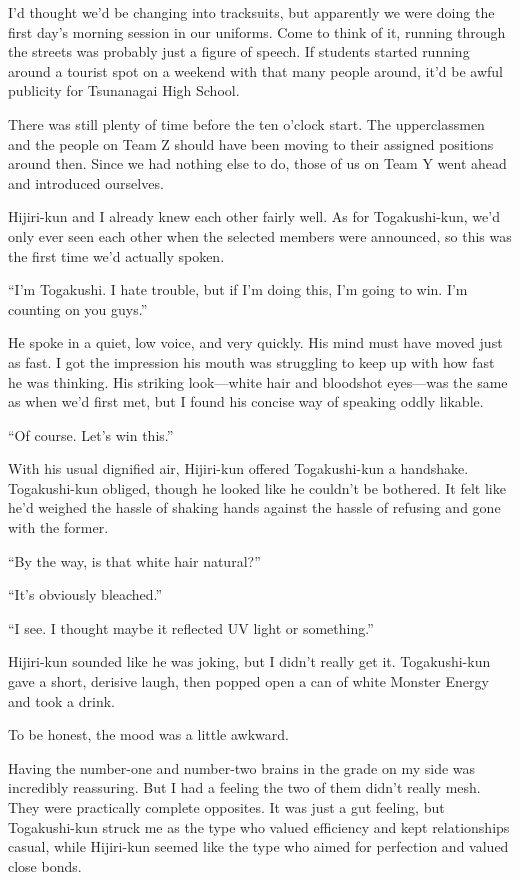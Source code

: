 \documentclass[
    a4paper,
    12pt,
    twoside,
    openany,
    UTF8,
    fontset=windows
]{ctexbook}
\begin{document}
I'd thought we'd be changing into tracksuits, but apparently we were doing the first day's morning session in our uniforms. Come to think of it, running through the streets was probably just a figure of speech. If students started running around a tourist spot on a weekend with that many people around, it'd be awful publicity for Tsunanagai High School.

There was still plenty of time before the ten o'clock start. The upperclassmen and the people on Team Z should have been moving to their assigned positions around then. Since we had nothing else to do, those of us on Team Y went ahead and introduced ourselves.

Hijiri-kun and I already knew each other fairly well. As for Togakushi-kun, we'd only ever seen each other when the selected members were announced, so this was the first time we'd actually spoken.

``I'm Togakushi. I hate trouble, but if I'm doing this, I'm going to win. I'm counting on you guys.''

He spoke in a quiet, low voice, and very quickly. His mind must have moved just as fast. I got the impression his mouth was struggling to keep up with how fast he was thinking. His striking look---white hair and bloodshot eyes---was the same as when we'd first met, but I found his concise way of speaking oddly likable.

``Of course. Let's win this.''

With his usual dignified air, Hijiri-kun offered Togakushi-kun a handshake. Togakushi-kun obliged, though he looked like he couldn't be bothered. It felt like he'd weighed the hassle of shaking hands against the hassle of refusing and gone with the former.

``By the way, is that white hair natural?''

``It's obviously bleached.''

``I see. I thought maybe it reflected UV light or something.''

Hijiri-kun sounded like he was joking, but I didn't really get it. Togakushi-kun gave a short, derisive laugh, then popped open a can of white Monster Energy and took a drink.

To be honest, the mood was a little awkward.

Having the number-one and number-two brains in the grade on my side was incredibly reassuring. But I had a feeling the two of them didn't really mesh. They were practically complete opposites. It was just a gut feeling, but Togakushi-kun struck me as the type who valued efficiency and kept relationships casual, while Hijiri-kun seemed like the type who aimed for perfection and valued close bonds.
\end{document}
